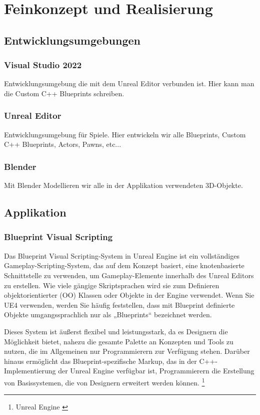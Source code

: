 \chapter{Feinkonzept und Realisierung}

\section{Entwicklungsumgebungen}
\subsection{Visual Studio 2022}
Entwicklungsumgebung die mit dem Unreal Editor verbunden ist. Hier kann man die Custom C++
Blueprints schreiben.

\subsection{Unreal Editor}
Entwicklungsumgebung für Spiele. Hier entwickeln wir alle Blueprints, Custom C++ Blueprints,
Actors, Pawns, etc...

\subsection{Blender}
Mit Blender Modellieren wir alle in der Applikation verwendeten 3D-Objekte.

\section{Applikation}

\subsection{Blueprint Visual Scripting}
Das Blueprint Visual Scripting-System in Unreal Engine ist ein vollständiges
Gameplay-Scripting-System, das auf dem Konzept basiert, eine knotenbasierte Schnittstelle
zu verwenden, um Gameplay-Elemente innerhalb des Unreal Editors zu erstellen.
Wie viele gängige Skriptsprachen wird sie zum Definieren objektorientierter (OO) Klassen
oder Objekte in der Engine verwendet. Wenn Sie UE4 verwenden, werden Sie häufig feststellen,
dass mit Blueprint definierte Objekte umgangssprachlich nur als „Blueprints“ bezeichnet werden.

Dieses System ist äußerst flexibel und leistungsstark, da es Designern die Möglichkeit bietet,
nahezu die gesamte Palette an Konzepten und Tools zu nutzen, die im Allgemeinen nur
Programmierern zur Verfügung stehen. Darüber hinaus ermöglicht das Blueprint-spezifische
Markup, das in der C++-Implementierung der Unreal Engine verfügbar ist, Programmierern die
Erstellung von Basissystemen, die von Designern erweitert werden können.
\footnote{Unreal Engine \cite{Blueprint-Visual-Scripting}}

